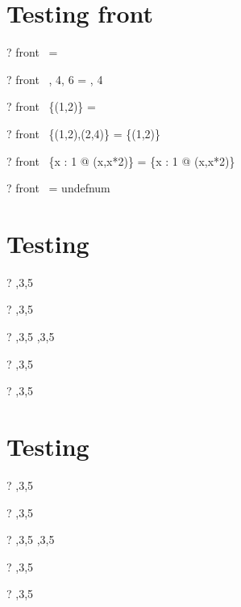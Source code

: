 \documentclass{article}
\begin{document}
\section{Testing front}
\begin{zed} \vdash? front~  \rangle = \emptyset \end{zed}
\begin{zed} \vdash? front~ , 4, 6 \rangle = , 4 \rangle \end{zed}
\begin{zed} \vdash? front~ \{(1,2)\} = \emptyset \end{zed}
\begin{zed} \vdash? front~ \{(1,2),(2,4)\} = \{(1,2)\} \end{zed}
\begin{zed} \vdash? front~ \{x : 1  @ (x,x*2)\} = \{x : 1  @ (x,x*2)\} \end{zed}
\begin{zed} \vdash? front~ \langle \rangle = undefnum \end{zed}


\section{Testing \prefix}
\begin{zed} \vdash? \langle \rangle  \prefix   {},3,5 \rangle \end{zed}
\begin{zed} \vdash?  \rangle  \prefix   {},3,5 \rangle \end{zed}
\begin{zed} \vdash? ,3,5 \rangle  \prefix   {},3,5 \rangle \end{zed}
\begin{zed} \vdash? \lnot {} \rangle  \prefix   {},3,5 \rangle \end{zed}
\begin{zed} \vdash? \lnot {} \rangle  \prefix   {},3,5 \rangle \end{zed}

\section{Testing \suffix}
\begin{zed} \vdash? \langle \rangle  \suffix   {},3,5 \rangle \end{zed}
\begin{zed} \vdash?  \rangle  \suffix   {},3,5 \rangle \end{zed}
\begin{zed} \vdash? ,3,5 \rangle  \suffix   {},3,5 \rangle \end{zed}
\begin{zed} \vdash? \lnot {} \rangle  \suffix   {},3,5 \rangle \end{zed}
\begin{zed} \vdash? \lnot {} \rangle  \suffix   {},3,5 \rangle \end{zed}
\end{document}
